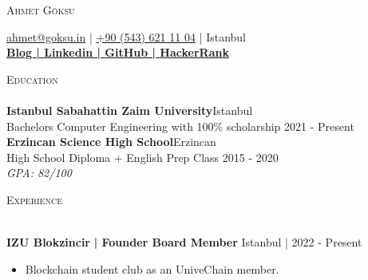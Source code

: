 \documentclass[a4paper]{article}
\newcommand{\lineunder} {
    \vspace*{-8pt} \\
    \hspace*{-18pt} \hrulefill \\
}
\newcommand{\header} [1] {
    {\hspace*{-18pt}\vspace*{6pt} \textsc{#1}}
    \vspace*{-6pt} \lineunder
}
\begin{document}
    \vspace*{-40pt}

    

%
%
  \vspace*{-2pt}
  \begin{center}
    {\Huge \scshape {Ahmet Göksu}}\\
    \vspace*{2pt}
    
    \vspace*{2pt}
    \href{mailto:ahmet@goksu.in}{ahmet@goksu.in} | \href{tel:+90 (543) 621 11 04}{+90 (543) 621 11 04} | Istanbul\\
    \vspace*{2pt}
    \textbf{\href{https://ahmet.goksu.in}{Blog | }}\textbf{\href{https://www.linkedin.com/in/ahmetgoksu}{Linkedin | }}\textbf{\href{https://www.github.com/goeksu}{GitHub | }}\textbf{\href{https://www.hackerrank.com/goeksu}{HackerRank}}\\
  \end{center}



      \header{Education}
      \vspace{2mm}
      \textbf{Istanbul Sabahattin Zaim University}\hfill Istanbul\\
Bachelors Computer Engineering with 100\% scholarship \hfill 2021 - Present\\

\vspace{2mm}
      \textbf{Erzincan Science High School}\hfill Erzincan\\
High School Diploma + English Prep Class \hfill 2015 - 2020\\
{\sl GPA: 82/100}\\
\vspace{2mm}

      \header{Experience}
      \vspace{2mm}

      \textbf{IZU Blokzincir}\textbf{ | Founder Board Member} \hfill Istanbul | 2022 - Present\\
          \vspace{-3mm}
\begin{itemize} \itemsep -3pt
\item[] Blockchain student club as an UniveChain member.
\end{itemize}
\end{document}
